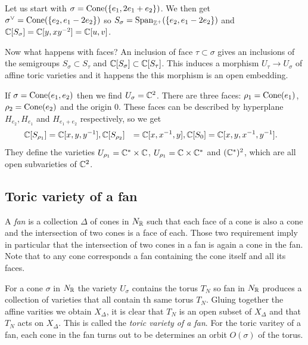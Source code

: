             \begin{examp*}
                Let us start with $\sigma=\text{Cone}(\{e_1,2e_1+e_2\})$. We then get $\sigma^\vee=\text{Cone}(\{e_2,e_1-2e_2\})$ so $S_\sigma=\text{Span}_{\mathbb{Z}^+}(\{e_2,e_1-2e_2\})$ and $\mathbb{C}[S_\sigma]=\mathbb{C}[y,xy^{-2}]=\mathbb{C}[u,v]$.
            \end{examp*}

            Now what happens with faces? An inclusion of face $\tau\subset\sigma$ gives an inclusions of the semigroups $S_\sigma\subset S_\tau$ and $\mathbb{C}[S_\sigma]\subset \mathbb{C}[S_\tau]$. This induces a morphism $U_\tau\to U_\sigma$ of affine toric varieties and it happens the this morphism is an open embedding.
            \begin{examp*}
                If $\sigma=\text{Cone}(e_1,e_2)$ then we find $U_\sigma=\mathbb{C}^2$. There are three faces: $\rho_1=\text{Cone}(e_1)$, $\rho_2=\text{Cone}(e_2)$ and the origin $0$. These faces can be described by hyperplane $H_{e_2}, H_{e_1}$ and $H_{e_1+e_2}$ respectively, so we get
                \begin{align}
                    \mathbb{C}[S_{\rho_1}] &= \mathbb{C}[x,y,y^{-1}],
                    \mathbb{C}[S_{\rho_2}] &= \mathbb{C}[x,x^{-1},y],
                    \mathbb{C}[S_{0}] &= \mathbb{C}[x,y,x^{-1},y^{-1}].
                \end{align}
                They define the varieties $U_{\rho_1}=\mathbb{C}^*\times\mathbb{C}$, $U_{\rho_1}=\mathbb{C}\times\mathbb{C}^*$ and $(\mathbb{C}^*)^2$, which are all open subvarieties of $\mathbb{C}^2$.
            \end{examp*}

        \subsection{Toric variety of a fan}
            
            A \emph{fan} is a collection $\Delta$ of cones in $N_{\mathbb{R}}$ such that each face of a cone is also a cone and the intersection of two cones is a face of each. Those two requirement imply in particular that the intersection of two cones in a fan is again a cone in the fan. Note that to any cone corresponds a fan containing the cone itself and all its faces.

            For a cone $\sigma$ in $N_{\mathbb{R}}$ the variety $U_\sigma$ contains the torus $T_N$ so fan in $N_{\mathbb{R}}$ produces a collection of varieties that all contain th same torus $T_N$. Gluing together the affine varities we obtain $X_\Delta$, it is clear that $T_N$ is an open subset of $X_\Delta$ and that $T_N$ acts on $X_\Delta$. This is called the \emph{toric variety of a fan}. For the toric varitey of a fan, each cone in the fan turns out to be determines an orbit $O(\sigma)$ of the torus.

